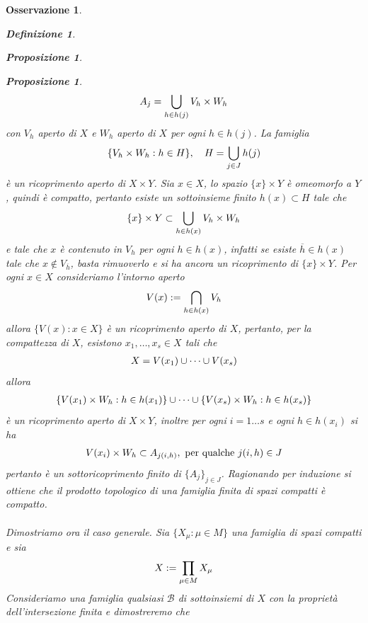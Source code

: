 \documentclass[oneside, 11pt]{amsbook}
\makeatletter
\newcommand{\0}{{(0)}}
\newcommand{\3}{{(3)}}
\theoremstyle{colonplain}
\newtheorem{prop}[thm]{Proposizione}
\theoremstyle{colondefinition}
\newtheorem{defn}[thm]{Definizione}
\theoremstyle{colonremark}
\newtheorem{rmk}[thm]{Osservazione}
\numberwithin{equation}{chapter}
\renewcommand{\proofname}{Dimostrazione}
\renewenvironment{proof}[1][\proofname]{\par
  \pushQED{\end{proof}}%
  \normalfont \topsep6\p@\@plus6\p@\relax
  \trivlist
  \item[\hskip\labelsep\bfseries #1:]\ignorespaces
}{%
  \popQED\endtrivlist\@endpefalse
}
\makeatother
\begin{document}
\begin{rmk}
\begin{defn}
\begin{prop}
\begin{prop}
\begin{proof}
\begin{align}
    A_j = \bigcup_{h \in h(j)} V_h \times W_h \notag
\end{align}
con $V_h$ aperto di $X$ e $W_h$ aperto di $X$ per ogni $h \in h(j)$. La famiglia
\begin{align}
    \{ V_h \times W_h : h \in H \}, \quad H = \bigcup_{j \in J} h(j) \notag
\end{align}
è un ricoprimento aperto di $X \times Y$. Sia $x \in X$, lo spazio $\{ x \} \times Y$ è omeomorfo a $Y$, quindi è compatto, pertanto esiste un sottoinsieme finito $h(x) \subset H$ tale che
\begin{align}
    \{ x \} \times Y \subset \bigcup_{h \in h(x)} V_h \times W_h \notag
\end{align}
e tale che $x$ è contenuto in $V_h$ per ogni $h \in h(x)$, infatti se esiste $\overline{h} \in h(x)$ tale che $x \not\in V_{\overline{h}}$, basta rimuoverlo e si ha ancora un ricoprimento di $\{ x \} \times Y$. Per ogni $x \in X$ consideriamo l'intorno aperto
\begin{align}
    V(x) := \bigcap_{h \in h(x)} V_h \notag
\end{align}
allora $\{ V(x) : x \in X \}$ è un ricoprimento aperto di $X$, pertanto, per la compattezza di $X$, esistono $x_1, \dots, x_s \in X$ tali che
\begin{align}
    X = V(x_1) \cup \dots \cup V(x_s) \notag
\end{align}
allora
\begin{align}
    \{ V(x_1) \times W_h : h \in h(x_1) \} \cup \dots \cup \{ V(x_s) \times W_h : h \in h(x_s) \} \notag
\end{align}
è un ricoprimento aperto di $X \times Y$, inoltre per ogni $i = 1 \dots s$ e ogni $h \in h(x_i)$ si ha
\begin{align}
    V(x_i) \times W_h \subset A_{j(i, h)}, \text{ per qualche } j(i, h) \in J \notag
\end{align}
pertanto è un sottoricoprimento finito di $\{ A_j \}_{j \in J}$. Ragionando per induzione si ottiene che il prodotto topologico di una famiglia finita di spazi compatti è compatto. \\ \\
Dimostriamo ora il caso generale. Sia $\{ X_\mu : \mu \in M \}$ una famiglia di spazi compatti e sia
\begin{align}
    X := \prod_{\mu \in M} X_\mu \notag
\end{align}
Consideriamo una famiglia qualsiasi $\mathcal{B}$ di sottoinsiemi di $X$ con la proprietà dell'intersezione finita e dimostreremo che

\end{proof}
\end{prop}
\end{prop}
\end{defn}
\end{rmk}
\end{document}
